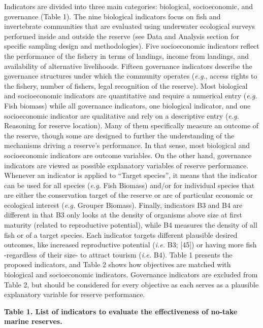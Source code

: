 \documentclass[12pt,]{article}
\begin{document}
Indicators are divided into three main categories: biological,
socioeconomic, and governance (Table 1). The nine biological indicators
focus on fish and invertebrate communities that are evaluated using
underwater ecological surveys performed inside and outside the reserve
(see Data and Analysis section for specific sampling design and
methodologies). Five socioeconomic indicators reflect the performance of
the fishery in terms of landings, income from landings, and availability
of alternative livelihoods. Fifteen governance indicators describe the
governance structures under which the community operates (\emph{e.g.},
access rights to the fishery, number of fishers, legal recognition of
the reserve). Most biological and socioeconomic indicators are
quantitative and require a numerical entry (\emph{e.g.} Fish biomass)
while all governance indicators, one biological indicator, and one
socioeconomic indicator are qualitative and rely on a descriptive entry
(\emph{e.g.} Reasoning for reserve location). Many of them specifically
measure an outcome of the reserve, though some are designed to further
the understanding of the mechanisms driving a reserve's performance. In
that sense, most biological and socioeconomic indicators are outcome
variables. On the other hand, governance indicators are viewed as
possible explanatory variables of reserve performance. Whenever an
indicator is applied to ``Target species'', it means that the indicator
can be used for all species (\emph{e.g.} Fish Biomass) and/or for
individual species that are either the conservation target of the
reserve or are of particular economic or ecological interest
(\emph{e.g.} Grouper Biomass). Finally, indicators B3 and B4 are
different in that B3 only looks at the density of organisms above size
at first maturity (related to reproductive potential), while B4 measures
the density of all fish or of a target species. Each indicator targets
different plausible desired outcomes, like increased reproductive
potential (\emph{i.e.} B3; {[}45{]}) or having more fish -regardless of
their size- to attract tourism (\emph{i.e.} B4). Table 1 presents the
proposed indicators, and Table 2 shows how objectives are matched with
biological and socioeconomic indicators. Governance indicators are
excluded from Table 2, but should be considered for every objective as
each serves as a plausible explanatory variable for reserve performance.

\clearpage

\textbf{Table 1. List of indicators to evaluate the effectiveness of
no-take marine reserves.}
\end{document}
